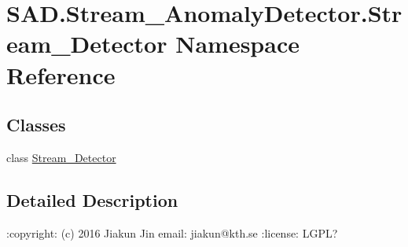 \hypertarget{namespaceSAD_1_1Stream__AnomalyDetector_1_1Stream__Detector}{}\section{S\+A\+D.\+Stream\+\_\+\+Anomaly\+Detector.\+Stream\+\_\+\+Detector Namespace Reference}
\label{namespaceSAD_1_1Stream__AnomalyDetector_1_1Stream__Detector}
\subsection*{Classes}
\begin{DoxyCompactItemize}
\item 
class \hyperlink{classSAD_1_1Stream__AnomalyDetector_1_1Stream__Detector_1_1Stream__Detector}{Stream\+\_\+\+Detector}
\end{DoxyCompactItemize}


\subsection{Detailed Description}
\begin{DoxyVerb}:copyright: (c) 2016 Jiakun Jin
email: jiakun@kth.se
:license: LGPL?
\end{DoxyVerb}
 